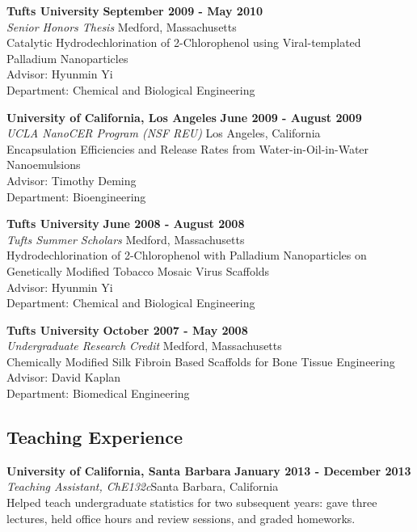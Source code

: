 {{\bf Tufts University} \hfill {\bf September 2009 - May 2010}\\
{\em Senior Honors Thesis} \hfill Medford, Massachusetts\\
Catalytic Hydrodechlorination of 2-Chlorophenol using Viral-templated Palladium Nanoparticles\\
Advisor: Hyunmin Yi \\
Department: Chemical and Biological Engineering

{\bf University of California, Los Angeles} \hfill {\bf June 2009 - August 2009}\\
{\em UCLA NanoCER Program (NSF REU)} \hfill Los Angeles, California\\
Encapsulation Efficiencies and Release Rates from Water-in-Oil-in-Water Nanoemulsions\\
Advisor: Timothy Deming\\
Department: Bioengineering

{\bf Tufts University} \hfill {\bf June 2008 - August 2008}\\
{\em Tufts Summer Scholars} \hfill Medford, Massachusetts\\
Hydrodechlorination of 2-Chlorophenol with Palladium Nanoparticles on Genetically Modified Tobacco Mosaic Virus Scaffolds\\
Advisor: Hyunmin Yi\\
Department: Chemical and Biological Engineering

{\bf Tufts University} \hfill {\bf October 2007 - May 2008}\\
{\em Undergraduate Research Credit} \hfill Medford, Massachusetts\\
Chemically Modified Silk Fibroin Based Scaffolds for Bone Tissue Engineering\\
Advisor: David Kaplan\\
Department: Biomedical Engineering

\subsection*{Teaching Experience}
{\bf University of California, Santa Barbara}  \hfill {\bf January 2013 -
  December 2013}\\
{\em Teaching Assistant, ChE132c}\hfill  Santa Barbara, California\\
Helped teach undergraduate statistics for two subsequent years: gave three
lectures, held office hours and review sessions, and graded homeworks.

}
